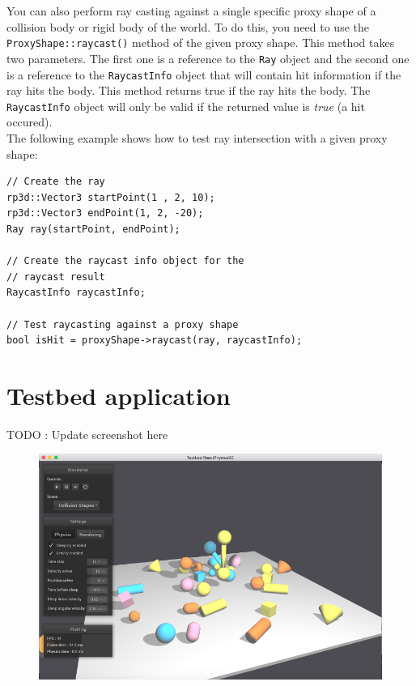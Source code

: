 \documentclass[a4paper,12pt]{article}
\begin{document}
    You can also perform ray casting against a single specific proxy shape of a collision body or rigid body of the world. To do this, you need to use the
    \texttt{ProxyShape::raycast()} method of the given proxy shape. This method takes two parameters. The first one is a reference to the \texttt{Ray}
    object and the second one is a reference to the \texttt{RaycastInfo} object that will contain hit information if the ray hits the body. This method returns
    true if the ray hits the body. The \texttt{RaycastInfo} object will only be valid if the returned value is \emph{true} (a hit occured). \\

    The following example shows how to test ray intersection with a given proxy shape: \\

    \begin{lstlisting}
// Create the ray
rp3d::Vector3 startPoint(1 , 2, 10);
rp3d::Vector3 endPoint(1, 2, -20);
Ray ray(startPoint, endPoint);

// Create the raycast info object for the
// raycast result
RaycastInfo raycastInfo;

// Test raycasting against a proxy shape
bool isHit = proxyShape->raycast(ray, raycastInfo);
    \end{lstlisting}

    \vspace{0.6cm}

    \section{Testbed application}
    \label{sec:testbed}

    TODO : Update screenshot here

    \begin{figure}[h]
        \centering
        \includegraphics{testbed.png}
        \label{fig:testbed}
    \end{figure}
\end{document}
